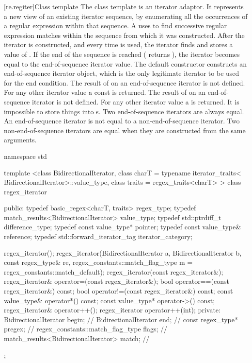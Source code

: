 [re.regiter]{Class template }
\pnum
{}%
%
The class template  is an iterator adaptor.
It represents a new view of an existing iterator sequence, by
enumerating all the occurrences of a regular expression within that
sequence. A  uses   to find successive
regular expression matches within the sequence from which it was
constructed.  After the iterator is constructed, and every time  is
used, the iterator finds and stores a value of
. If the end of the sequence is
reached ( returns ), the iterator becomes equal to
the end-of-sequence iterator value. The default constructor
constructs an end-of-sequence iterator object,
which is the only legitimate iterator to be used for the end
condition. The result of  on an end-of-sequence iterator is not
defined. For any other iterator value a const
 is returned. The result of
 on an end-of-sequence iterator is not defined. For any other
iterator value a  is
returned. It is impossible to store things into s. Two
end-of-sequence iterators are always equal. An end-of-sequence
iterator is not equal to a non-end-of-sequence iterator. Two
non-end-of-sequence iterators are equal when they are constructed from
the same arguments.  

\begin{codeblock}
namespace std {
  template <class BidirectionalIterator, 
            class charT = typename iterator_traits<
              BidirectionalIterator>::value_type,
              class traits = regex_traits<charT> >
  class regex_iterator {
  public:
     typedef basic_regex<charT, traits>           regex_type;
     typedef match_results<BidirectionalIterator> value_type;
     typedef std::ptrdiff_t                       difference_type;
     typedef const value_type*                    pointer;
     typedef const value_type&                    reference;
     typedef std::forward_iterator_tag            iterator_category;
   
     regex_iterator();
     regex_iterator(BidirectionalIterator a, BidirectionalIterator b, 
                    const regex_type& re, 
                    regex_constants::match_flag_type m =
                      regex_constants::match_default);
     regex_iterator(const regex_iterator&);
     regex_iterator& operator=(const regex_iterator&);
     bool operator==(const regex_iterator&) const;
     bool operator!=(const regex_iterator&) const;
     const value_type& operator*() const;
     const value_type* operator->() const;
     regex_iterator& operator++();
     regex_iterator operator++(int);
  private:
     BidirectionalIterator                begin;  // \expos
     BidirectionalIterator                end;    // \expos
     const regex_type*                    pregex; // \expos
     regex_constants::match_flag_type     flags;  // \expos
     match_results<BidirectionalIterator> match;  // \expos
  }; 
}
\end{codeblock}

